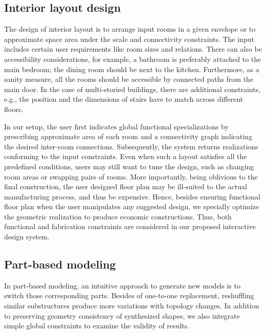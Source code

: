 \subsection{Interior layout design}

The design of interior layout is to arrange input rooms in a given envelope or to approximate space area under the scale and connectivity constraints. The input includes certain user requirements like room sizes and relations. There can also be accessibility considerations, for example, a bathroom is preferably attached to the main bedroom; the dining room should be next to the kitchen. Furthermore, as a sanity measure, all the rooms should be accessible by connected paths from the main door. In the case of multi-storied buildings, there are additional constraints, e.g., the position and the dimensions of stairs have to match across different floors.

In our setup, the user first indicates global functional specializations by prescribing approximate area of each room and a connectivity graph indicating the desired inter-room connections. Subsequently, the system returns realizations conforming to the input constraints. Even when such a layout satisfies all the predefined conditions, users may still want to tune the design, such as changing room areas or swapping pairs of rooms. More importantly, being oblivious to the final construction, the user designed floor plan may be ill-suited to the actual manufacturing process, and thus be expensive. Hence, besides ensuring functional floor plan when the user manipulates any suggested design, we specially optimize the geometric realization to produce economic constructions. Thus, both functional and fabrication constraints are considered in our proposed interactive design system.

\subsection{Part-based modeling}

In part-based modeling, an intuitive approach to generate new models is to switch those corresponding parts. Besides of one-to-one replacement, reshuffling similar substructures produce more variations with topology changes. In addition to preserving geometry consistency of synthesized shapes, we also integrate simple global constraints to examine the validity of results.

